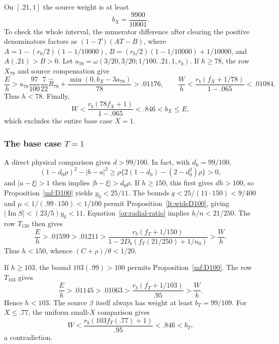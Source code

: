 \documentclass[11pt,reqno]{amsart}
\numberwithin{equation}{section}
\theoremstyle{definition}
\theoremstyle{remark}
\renewcommand{\Im}{\operatorname{Im}}
\begin{document}
On $[.21,1]$ the source weight is at least
\[
                   b_X=\frac{9900}{10001}.
\]
To check the whole interval, the numerator difference after clearing
the positive denominators factors as $(1-T)(AT-B)$, where
$A=1-(r_b/2)(1-1/10000)$,
$B=(r_b/2)(1-1/10000)+1/10000$, and $A(.21)>B>0$.
Let
$a_{78}=\omega(3/20,3/20;1/100,.21,1,r_b)$.
If $h\ge78$, the row $X_{78}$ and source compensation give
\[
 \frac Eh>
 a_{78}\frac{97}{100}\frac7{22}\widehat R_{78}
            +\frac{\min(0,b_X-3a_{78})}{78}>.01176,
 \qquad
 \frac Wh<\frac{r_b(f_X+1/78)}{1-.065}<.01084.
\]
Thus $h<78$.  Finally,
\[
              W<\frac{r_b(78f_X+1)}{1-.065}<.846<b_X\le E,
\]
which excludes the entire base case $X=1$.

\subsubsection{The base case $T=1$}

A direct physical comparison gives $d>99/100$.  In fact, with
$d_0=99/100$,
\[
 (1-d_0\rho)^2-|b-a|^2
 \ge\rho\{2(1-d_0)-(2-d_0^2)\rho\}>0,
\]
and $|a-\xi|>1$ then implies $|b-\xi|>d_0\rho$.
If $h\ge150$, this first gives $dh>100$, so
Proposition~\ref{mf:D100} yields $y_0<25/11$.  The bounds
$q<25/(11\cdot150)<9/400$ and
$\mu<1/(.99\cdot150)<1/100$ permit Proposition~\ref{lt:wideD100},
giving $|\Im S|<(23/5)y_0<11$.
Equation~\eqref{or:radial-ratio} implies $h/n<21/250$.
The row $T_{150}$ then gives
\[
 \frac Eh>.01599>.01211>
 \frac{r_b(f_T+1/150)}{1-2D_b(f_T(21/250)+1/n_0)}>\frac Wh.
\]
Thus $h<150$, whence $(C+\rho)/\theta<1/20$.

If $h\ge103$, the bound $103(.99)>100$ permits
Proposition~\ref{mf:D100}.
The row $T_{103}$ gives
\[
 \frac Eh>.01145>.01063>
              \frac{r_b(f_T+1/103)}{.95}>\frac Wh.
\]
Hence $h<103$.  The source $\beta$ itself always has weight at least
$b_T=99/109$.  For $X\le.77$, the uniform small-$X$ comparison
gives
\[
            W<\frac{r_b(103f_T(.77)+1)}{.95}<.846<b_T,
\]
a contradiction.
\end{document}
